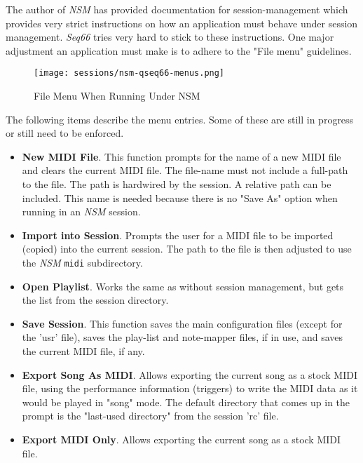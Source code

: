    The author of \textsl{NSM} has provided documentation for session-management
   which provides very strict instructions on how an application must behave
   under session management.  \textsl{Seq66} tries very hard to stick to these
   instructions.  One major adjustment an application must make is to adhere to
   the "File menu" guidelines.

\begin{figure}[H]
   \centering 
   \texttt{[image: sessions/nsm-qseq66-menus.png]}
   \caption*{File Menu When Running Under NSM}
\end{figure}

   The following items describe the menu entries.  Some of these are still in
   progress or still need to be enforced.

   \begin{itemize}
      \item \textbf{New MIDI File}.
         This function prompts for the name of a
         new MIDI file and clears the current MIDI file.  The file-name must not
         include a full-path to the file.  The path is hardwired by the
         session.  A relative path can be included.  This name is needed
         because there is no "Save As" option when running in an \textsl{NSM}
         session.
      \item \textbf{Import into Session}.
         Prompts the user for a MIDI file to
         be imported (copied) into the current session.  The path to the file
         is then adjusted to use the \textsl{NSM} \texttt{midi} subdirectory.
      \item \textbf{Open Playlist}.
         Works the same as without session
         management, but gets the list from the session directory.
      \item \textbf{Save Session}.
         This function saves the main configuration
         files (except for the 'usr' file), saves the play-list and note-mapper
         files, if in use, and saves the current MIDI file, if any.
      \item \textbf{Export Song As MIDI}.
         Allows exporting the current song as a stock MIDI file, using the
         performance information (triggers) to write the MIDI data as it would
         be played in "song" mode.
         The default directory that comes up in the
         prompt is the "last-used directory" from the session 'rc' file.
      \item \textbf{Export MIDI Only}.
         Allows exporting the current song as a stock MIDI file.

\end{itemize}
